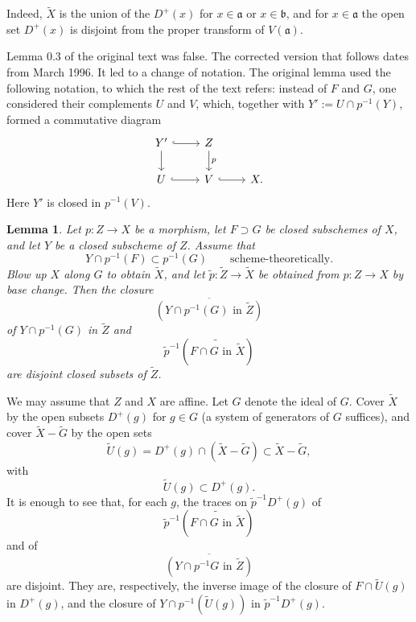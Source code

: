 \documentclass[11pt,a4paper]{article}
\theoremstyle{plain}
\newtheorem{lemma}[theorem]{Lemma}
\theoremstyle{definition}
\begin{document}
Indeed, $\widetilde{X}$ is the union of the $D^+(x)$ for $x\in\mathfrak{a}$ or $x\in\mathfrak{b}$, and for $x\in\mathfrak{a}$ the open set $D^+(x)$ is disjoint from the proper transform of $V(\mathfrak{a})$.

\bigskip
Lemma 0.3 of the original text was false. The corrected version that follows dates from March 1996. It led to a change of notation. The original lemma used the following notation, to which the rest of the text refers: instead of $F$ and $G$, one considered their complements $U$ and $V$, which, together with $Y' := U\cap p^{-1}(Y)$, formed a commutative diagram
\[
\begin{tikzcd}
Y' \arrow[d] \arrow[r, hook] & Z \arrow[d, "p"] \\
U \arrow[r, hook] & V \arrow[r, hook] & X .
\end{tikzcd}
\]
Here $Y'$ is closed in $p^{-1}(V)$.

\begin{lemma}
Let $p:Z\to X$ be a morphism, let $F\supset G$ be closed subschemes of $X$, and let $Y$ be a closed subscheme of $Z$. Assume that
\[
Y\cap p^{-1}(F)\subset p^{-1}(G)\qquad\text{scheme-theoretically.}
\]
Blow up $X$ along $G$ to obtain $\widetilde{X}$, and let $\tilde p:\widetilde{Z}\to\widetilde{X}$ be obtained from $p:Z\to X$ by base change. Then the closure
\[
\overline{(Y\cap p^{-1}(G)\text{ in }\widetilde{Z})}
\]
of $Y\cap p^{-1}(G)$ in $\widetilde{Z}$ and
\[
\tilde p^{-1}(\widetilde{F\cap G\text{ in }\widetilde{X}})
\]
are disjoint closed subsets of $\widetilde{Z}$.
\end{lemma}

We may assume that $Z$ and $X$ are affine. Let $G$ denote the ideal of $G$. Cover $\widetilde{X}$ by the open subsets $D^+(g)$ for $g\in G$ (a system of generators of $G$ suffices), and cover $\widetilde{X}-\widetilde{G}$ by the open sets
\[
\widetilde U(g)=D^+(g)\cap(\widetilde X-\widetilde G)\subset \widetilde X-\widetilde G,
\]
with
\[
\widetilde U(g)\subset D^+(g).
\]
It is enough to see that, for each $g$, the traces on $\tilde p^{-1}D^+(g)$ of
\[
\tilde p^{-1}(\widetilde{F\cap G\text{ in }\widetilde X})
\]
and of
\[
\overline{(Y\cap p^{-1}G\text{ in }\widetilde Z)}
\]
are disjoint. They are, respectively, the inverse image of the closure of $F\cap\widetilde U(g)$ in $D^+(g)$, and the closure of $Y\cap p^{-1}(\widetilde U(g))$ in $\tilde p^{-1}D^+(g)$.
\end{document}
